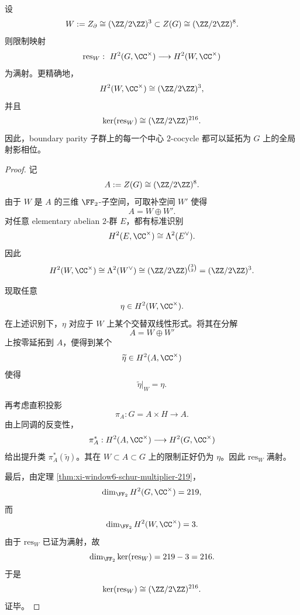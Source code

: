 \begin{theorem}\label{thm:xi-window6-boundary-parity-cocycle-extension}
设
\[
W:=Z_{\partial}\cong (\ZZ/2\ZZ)^3\subset Z(G)\cong (\ZZ/2\ZZ)^8.
\]
则限制映射
\[
\mathrm{res}_W:\ H^2(G,\CC^\times)\longrightarrow H^2(W,\CC^\times)
\]
为满射。更精确地，
\[
H^2(W,\CC^\times)\cong (\ZZ/2\ZZ)^3,
\]
并且
\[
\ker(\mathrm{res}_W)\cong (\ZZ/2\ZZ)^{216}.
\]
因此，boundary parity 子群上的每一个中心 \(2\)-cocycle 都可以延拓为 \(G\) 上的全局射影相位。
\end{theorem}
\begin{proof}
记
\[
A:=Z(G)\cong (\ZZ/2\ZZ)^8.
\]
由于 \(W\) 是 \(A\) 的三维 \(\FF_2\)-子空间，可取补空间 \(W'\) 使得
\[
A=W\oplus W'.
\]
对任意 elementary abelian \(2\)-群 \(E\)，都有标准识别
\[
H^2(E,\CC^\times)\cong \Lambda^2(E^\vee).
\]
因此
\[
H^2(W,\CC^\times)\cong \Lambda^2(W^\vee)\cong (\ZZ/2\ZZ)^{\binom32}=(\ZZ/2\ZZ)^3.
\]

现取任意
\[
\eta\in H^2(W,\CC^\times).
\]
在上述识别下，\(\eta\) 对应于 \(W\) 上某个交替双线性形式。将其在分解
\[
A=W\oplus W'
\]
上按零延拓到 \(A\)，便得到某个
\[
\widetilde\eta\in H^2(A,\CC^\times)
\]
使得
\[
\widetilde\eta|_W=\eta.
\]

再考虑直积投影
\[
\pi_A:G=A\times H\longrightarrow A.
\]
由上同调的反变性，
\[
\pi_A^*:H^2(A,\CC^\times)\longrightarrow H^2(G,\CC^\times)
\]
给出提升类 \(\pi_A^*(\widetilde\eta)\)。其在 \(W\subset A\subset G\) 上的限制正好仍为 \(\eta\)。因此 \(\mathrm{res}_W\) 满射。

最后，由定理 \ref{thm:xi-window6-schur-multiplier-219}，
\[
\dim_{\FF_2}H^2(G,\CC^\times)=219,
\]
而
\[
\dim_{\FF_2}H^2(W,\CC^\times)=3.
\]
由于 \(\mathrm{res}_W\) 已证为满射，故
\[
\dim_{\FF_2}\ker(\mathrm{res}_W)=219-3=216.
\]
于是
\[
\ker(\mathrm{res}_W)\cong (\ZZ/2\ZZ)^{216}.
\]
证毕。
\end{proof}

\endinput

